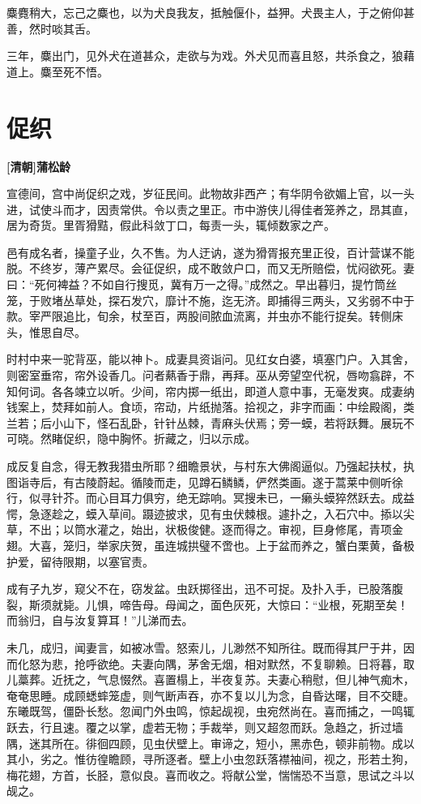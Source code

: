 \documentclass[UTF8,titlepage,oneside]{ctexbook}
\begin{document}
麋麑稍大，忘己之麋也，以为犬良我友，抵触偃仆，益狎。犬畏主人，于之俯仰甚善，然时啖其舌。

三年，麋出门，见外犬在道甚众，走欲与为戏。外犬见而喜且怒，共杀食之，狼藉道上。麋至死不悟。



\chapter*{促织}
\begin{center}
	\textbf{[清朝]蒲松龄}
\end{center}

宣德间，宫中尚促织之戏，岁征民间。此物故非西产；有华阴令欲媚上官，以一头进，试使斗而才，因责常供。令以责之里正。市中游侠儿得佳者笼养之，昂其直，居为奇货。里胥猾黠，假此科敛丁口，每责一头，辄倾数家之产。

邑有成名者，操童子业，久不售。为人迂讷，遂为猾胥报充里正役，百计营谋不能脱。不终岁，薄产累尽。会征促织，成不敢敛户口，而又无所赔偿，忧闷欲死。妻曰：“死何裨益？不如自行搜觅，冀有万一之得。”成然之。早出暮归，提竹筒丝笼，于败堵丛草处，探石发穴，靡计不施，迄无济。即捕得三两头，又劣弱不中于款。宰严限追比，旬余，杖至百，两股间脓血流离，并虫亦不能行捉矣。转侧床头，惟思自尽。

时村中来一驼背巫，能以神卜。成妻具资诣问。见红女白婆，填塞门户。入其舍，则密室垂帘，帘外设香几。问者爇香于鼎，再拜。巫从旁望空代祝，唇吻翕辟，不知何词。各各竦立以听。少间，帘内掷一纸出，即道人意中事，无毫发爽。成妻纳钱案上，焚拜如前人。食顷，帘动，片纸抛落。拾视之，非字而画：中绘殿阁，类兰若；后小山下，怪石乱卧，针针丛棘，青麻头伏焉；旁一蟆，若将跃舞。展玩不可晓。然睹促织，隐中胸怀。折藏之，归以示成。

成反复自念，得无教我猎虫所耶？细瞻景状，与村东大佛阁逼似。乃强起扶杖，执图诣寺后，有古陵蔚起。循陵而走，见蹲石鳞鳞，俨然类画。遂于蒿莱中侧听徐行，似寻针芥。而心目耳力俱穷，绝无踪响。冥搜未已，一癞头蟆猝然跃去。成益愕，急逐趁之，蟆入草间。蹑迹披求，见有虫伏棘根。遽扑之，入石穴中。掭以尖草，不出；以筒水灌之，始出，状极俊健。逐而得之。审视，巨身修尾，青项金翅。大喜，笼归，举家庆贺，虽连城拱璧不啻也。上于盆而养之，蟹白栗黄，备极护爱，留待限期，以塞官责。

成有子九岁，窥父不在，窃发盆。虫跃掷径出，迅不可捉。及扑入手，已股落腹裂，斯须就毙。儿惧，啼告母。母闻之，面色灰死，大惊曰：“业根，死期至矣！而翁归，自与汝复算耳！”儿涕而去。

未几，成归，闻妻言，如被冰雪。怒索儿，儿渺然不知所往。既而得其尸于井，因而化怒为悲，抢呼欲绝。夫妻向隅，茅舍无烟，相对默然，不复聊赖。日将暮，取儿藁葬。近抚之，气息惙然。喜置榻上，半夜复苏。夫妻心稍慰，但儿神气痴木，奄奄思睡。成顾蟋蟀笼虚，则气断声吞，亦不复以儿为念，自昏达曙，目不交睫。东曦既驾，僵卧长愁。忽闻门外虫鸣，惊起觇视，虫宛然尚在。喜而捕之，一鸣辄跃去，行且速。覆之以掌，虚若无物；手裁举，则又超忽而跃。急趋之，折过墙隅，迷其所在。徘徊四顾，见虫伏壁上。审谛之，短小，黑赤色，顿非前物。成以其小，劣之。惟彷徨瞻顾，寻所逐者。壁上小虫忽跃落襟袖间，视之，形若土狗，梅花翅，方首，长胫，意似良。喜而收之。将献公堂，惴惴恐不当意，思试之斗以觇之。
\end{document}
